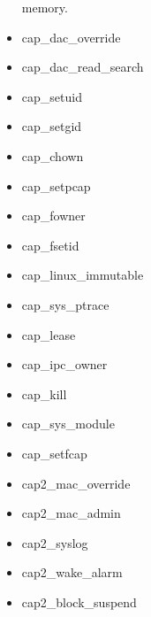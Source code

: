 \documentclass{article}
\begin{document}
\begin{itemize}
       memory.
 \item cap\_dac\_override\\ 
 \item cap\_dac\_read\_search \\
 \item cap\_setuid 
 \item cap\_setgid \\
 \item cap\_chown \\
 \item cap\_setpcap\\
 \item cap\_fowner\\
 \item cap\_fsetid \\
 \item cap\_linux\_immutable\\
 \item cap\_sys\_ptrace\\
 \item cap\_lease\\
 \item cap\_ipc\_owner\\
 \item cap\_kill\\
 \item cap\_sys\_module\\
 \item cap\_setfcap\\
 \item cap2\_mac\_override\\
 \item cap2\_mac\_admin\\
 \item cap2\_syslog\\
 \item cap2\_wake\_alarm\\
 \item cap2\_block\_suspend

\end{itemize}
\end{document}
